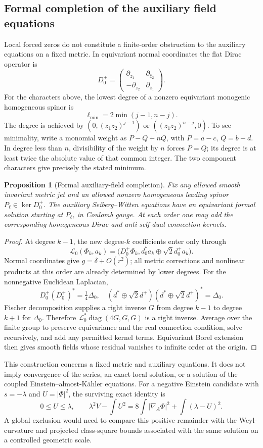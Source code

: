 \documentclass[11pt,a4paper]{article}
\newtheorem{proposition}[theorem]{Proposition}
\theoremstyle{definition}\newtheorem{definition}[theorem]{Definition}
\theoremstyle{remark}\newtheorem{remark}[theorem]{Remark}
\begin{document}
\subsection{Formal completion of the auxiliary field equations}
Local forced zeros do not constitute a finite-order obstruction to the auxiliary equations on a fixed metric. In equivariant normal coordinates the flat Dirac operator is
\[
 D_0^+=\begin{pmatrix}\partial_{z_1}&\partial_{\bar z_2}\\
 -\partial_{z_2}&\partial_{\bar z_1}\end{pmatrix}.
\]
For the characters above, the lowest degree of a nonzero equivariant monogenic homogeneous spinor is
\[
 \ell_{\min}=2\min(j-1,n-j).
\]
The degree is achieved by $(0,(z_1z_2)^{j-1})$ or $((\bar z_1\bar z_2)^{n-j},0)$. To see minimality, write a monomial weight as $P-Q+nQ$, with $P=a-c$, $Q=b-d$. In degree less than $n$, divisibility of the weight by $n$ forces $P=Q$; its degree is at least twice the absolute value of that common integer. The two component characters give precisely the stated minimum.

\begin{proposition}[Formal auxiliary-field completion]\label{prop:formal}
Fix any allowed smooth invariant metric jet and an allowed nonzero homogeneous leading spinor $P_\ell\in\ker D_0^+$. The auxiliary Seiberg--Witten equations have an equivariant formal solution starting at $P_\ell$, in Coulomb gauge. At each order one may add the corresponding homogeneous Dirac and anti-self-dual connection kernels.
\end{proposition}
\begin{proof}
At degree $k-1$, the new degree-$k$ coefficients enter only through
\[
 \mathcal L_0(\Phi_k,a_k)
 =\bigl(D_0^+\Phi_k,d_0^*a_k\oplus\sqrt2d_0^+a_k\bigr).
\]
Normal coordinates give $g=\delta+O(r^2)$; all metric corrections and nonlinear products at this order are already determined by lower degrees. For the nonnegative Euclidean Laplacian,
\[
 D_0^+(D_0^+)^*=\tfrac14\Delta_0,
 \quad(d^*\oplus\sqrt2d^+)(d^*\oplus\sqrt2d^+)^*=\Delta_0.
\]
Fischer decomposition supplies a right inverse $G$ from degree $k-1$ to degree $k+1$ for $\Delta_0$. Therefore $\mathcal L_0^*\operatorname{diag}(4G,G,G)$ is a right inverse. Average over the finite group to preserve equivariance and the real connection condition, solve recursively, and add any permitted kernel terms. Equivariant Borel extension then gives smooth fields whose residual vanishes to infinite order at the origin.
\end{proof}
This construction concerns a fixed metric and auxiliary equations. It does not imply convergence of the series, an exact local solution, or a solution of the coupled Einstein--almost-Kähler equations. For a negative Einstein candidate with $s=-\lambda$ and $U=|\Phi|^2$, the surviving exact identity is
\[
 0\le U\le\lambda,\qquad
 \lambda^2V-\int U^2=8\int|\nabla_A\Phi|^2+\int(\lambda-U)^2.
\]
A global exclusion would need to compare this positive remainder with the Weyl-curvature and projected class-square bounds associated with the same solution on a controlled geometric scale.
\end{document}
